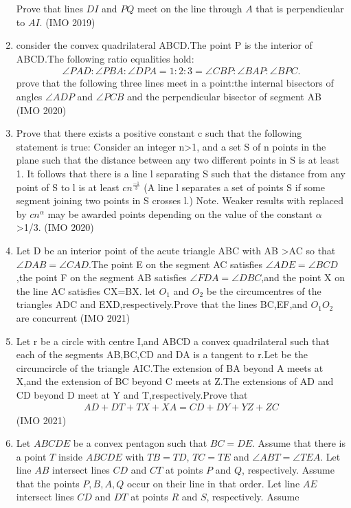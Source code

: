 \begin{enumerate}
Prove that lines $DI$ and $PQ$ meet on the line through $ A$ that is perpendicular to $AI$.
\hfill(IMO 2019)
\item consider the convex quadrilateral ABCD.The point P is the interior of ABCD.The following ratio equalities hold:
\begin{align}
\angle PAD: \angle PBA: \angle DPA =1:2:3 = \angle CBP: \angle BAP: \angle BPC.
\end{align} 
prove
 that the following three lines meet in a point:the internal bisectors 
of angles $\angle ADP$ and $\angle PCB$ and the perpendicular bisector 
of segment AB
\hfill(IMO 2020)
\item Prove that there exists a positive constant c such that the following statement is true:
Consider an integer n\textgreater1, and a set S of n points in the plane such that the distance between
any
 two different points in S is at least 1. It follows that there is a 
line l separating S such that the distance from any point of S to l is 
at least $cn^\frac{-1}{3}$
(A line l separates a set of points S if some segment joining two points in S crosses l.)
Note. Weaker results with  replaced by $cn^\alpha$ may be awarded points depending on the value of the constant $ \alpha$ \textgreater1/3.
   \hfill(IMO 2020)
\item Let D be an interior point of the acute triangle ABC with AB \textgreater AC so that $\angle DAB = \angle CAD$.The point E on the segment AC satisfies $\angle ADE=\angle BCD$,the point F on the segment AB satisfies $\angle FDA=\angle DBC$,and the point X on the line AC satisfies CX=BX. let $O_{1}$ and $O_{2}$ be the circumcentres of the triangles ADC and EXD,respectively.Prove that the lines BC,EF,and $O_{1} O_{2}$ are concurrent
 \hfill(IMO 2021)
\item Let r be a circle with centre I,and ABCD a convex quadrilateral such that each of the segments AB,BC,CD and DA is a tangent to r.Let \ohm be the circumcircle of the triangle AIC.The extension of BA beyond A meets \ohm at X,and the extension of BC beyond C meets \ohm at Z.The extensions of AD and CD beyond D meet \ohm at Y and T,respectively.Prove that
\begin{align}
    AD+DT+TX+XA=CD+DY+YZ+ZC
\end{align}
 \hfill(IMO 2021)
 \item
Let $ABCDE$  be a convex pentagon such that  $BC = DE$.  Assume that there is a point  $T$  inside  $ABCDE$ with  $TB = TD$,  $TC = TE$  and  $\angle{ABT} = \angle{TEA}$.  Let line  $AB$  intersect 
lines $CD$  and  $CT$  at points  $P$  and $Q$,  respectively. Assume that the points  $P, B, A, Q$  occur on their line in that order. Let line  $AE$  intersect lines  $CD$  and  $DT$  at points  $R$  and  $S$,  respectively. Assume 

\end{enumerate}
